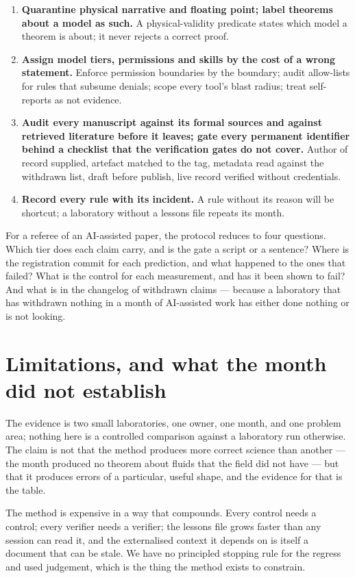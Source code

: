 \documentclass[11pt]{article}
\begin{document}
\begin{enumerate}[leftmargin=*,itemsep=2pt]
  rather than re-earning them.
\item \textbf{Quarantine physical narrative and floating point; label theorems about a model
  as such.} A physical-validity predicate states which model a theorem is about; it never
  rejects a correct proof.
\item \textbf{Assign model tiers, permissions and skills by the cost of a wrong statement.}
  Enforce permission boundaries by the boundary; audit allow-lists for rules that subsume
  denials; scope every tool's blast radius; treat self-reports as not evidence.
\item \textbf{Audit every manuscript against its formal sources and against retrieved
  literature before it leaves; gate every permanent identifier behind a checklist that the
  verification gates do not cover.} Author of record supplied, artefact matched to the tag,
  metadata read against the withdrawn list, draft before publish, live record verified without
  credentials.
\item \textbf{Record every rule with its incident.} A rule without its reason will be
  shortcut; a laboratory without a lessons file repeats its month.
\end{enumerate}

For a referee of an AI-assisted paper, the protocol reduces to four questions. Which tier does
each claim carry, and is the gate a script or a sentence? Where is the registration commit for
each prediction, and what happened to the ones that failed? What is the control for each
measurement, and has it been shown to fail? And what is in the changelog of withdrawn claims ---
because a laboratory that has withdrawn nothing in a month of AI-assisted work has either done
nothing or is not looking.

\section{Limitations, and what the month did not establish}
\label{sec:limits}

The evidence is two small laboratories, one owner, one month, and one problem area; nothing
here is a controlled comparison against a laboratory run otherwise. The claim is not that the
method produces more correct science than another --- the month produced no theorem about
fluids that the field did not have --- but that it produces errors of a particular, useful
shape, and the evidence for that is the table.

The method is expensive in a way that compounds. Every control needs a control; every
verifier needs a verifier; the lessons file grows faster than any session can read it, and the
externalised context it depends on is itself a document that can be stale. We have no
principled stopping rule for the regress and used judgement, which is the thing the method
exists to constrain.
\end{document}
